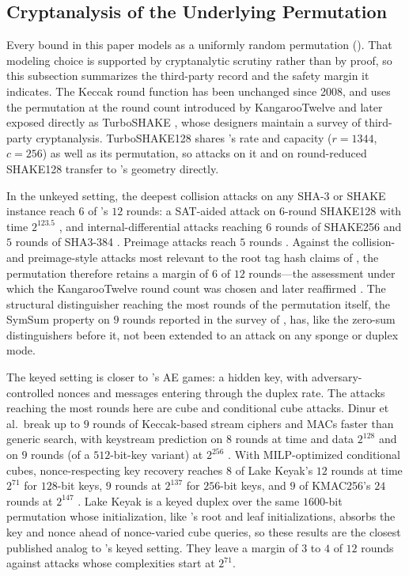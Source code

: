 \subsection{Cryptanalysis of the Underlying Permutation}
\label{sec:permutation-cryptanalysis}

Every bound in this paper models \Keccakp{} as a uniformly random permutation
(). That modeling choice is supported by
cryptanalytic scrutiny rather than by proof, so this subsection summarizes the
third-party record and the safety margin it indicates. The Keccak round
function has been unchanged since 2008, and \TW{} uses the permutation at the
round count introduced by KangarooTwelve \cite{BDPVVV16} and later exposed
directly as TurboSHAKE \cite{BDHPVVV23}, whose designers maintain a survey of
third-party cryptanalysis. TurboSHAKE128 shares \TW{}'s rate and capacity
($r = 1344$, $c = 256$) as well as its permutation, so attacks on it and on
round-reduced SHAKE128 transfer to \TW{}'s geometry directly.

In the unkeyed setting, the deepest collision attacks on any SHA-3 or SHAKE
instance reach $6$ of \TW{}'s $12$ rounds: a SAT-aided attack on $6$-round
SHAKE128 with time $2^{123.5}$ \cite{GLST22}, and internal-differential
attacks reaching $6$ rounds of SHAKE256 and $5$ rounds of SHA3-384
\cite{ZHL24}. Preimage attacks reach $5$ rounds \cite{ZHL25}. Against the
collision- and preimage-style attacks most relevant to the root tag hash
claims of , the permutation therefore
retains a margin of $6$ of $12$ rounds---the assessment under which the
KangarooTwelve round count was chosen and later reaffirmed
\cite{BDPVVV16,BDHPVVV23}. The structural distinguisher reaching the most
rounds of the permutation itself, the SymSum property on $9$ rounds reported
in the survey of \cite{BDHPVVV23}, has, like the zero-sum distinguishers
before it, not been extended to an attack on any sponge or duplex mode.

The keyed setting is closer to \TW{}'s AE games: a hidden key, with
adversary-controlled nonces and messages entering through the duplex rate.
The attacks reaching the most rounds here are cube and conditional cube
attacks. Dinur et al.~break up to $9$ rounds of Keccak-based stream ciphers
and MACs faster than generic search, with keystream prediction on $8$ rounds
at time and data $2^{128}$ and on $9$ rounds (of a $512$-bit-key variant) at
$2^{256}$ \cite{DMPSS15}. With MILP-optimized conditional cubes,
nonce-respecting key recovery reaches $8$ of Lake Keyak's $12$ rounds at time
$2^{71}$ for $128$-bit keys, $9$ rounds at $2^{137}$ for $256$-bit keys, and
$9$ of KMAC256's $24$ rounds at $2^{147}$ \cite{SGLS18}. Lake Keyak is a
keyed duplex over the same $1600$-bit permutation whose initialization, like
\TW{}'s root and leaf initializations, absorbs the key and nonce ahead of
nonce-varied cube queries, so these results are the closest published analog
to \TW{}'s keyed setting. They leave a margin of $3$ to $4$ of $12$ rounds
against attacks whose complexities start at $2^{71}$.

